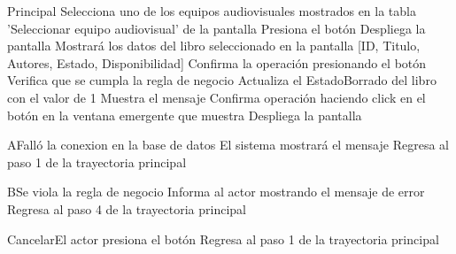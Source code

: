 
\begin{UCtrayectoria}{Principal}
		\UCpaso[\UCactor] Selecciona uno de los equipos audiovisuales mostrados en la tabla 'Seleccionar equipo audiovisual' de la pantalla 
		\UCpaso[\UCactor] Presiona el botón  
		\UCpaso[\UCsist] Despliega la pantalla 
		\UCpaso[\UCsist] Mostrará los datos del libro seleccionado en la pantalla [ID, Titulo, Autores, Estado, Disponibilidad]
		\UCpaso[\UCactor] Confirma la operación presionando el botón  
		\UCpaso[\UCsist] Verifica que se cumpla la regla de negocio  
		\UCpaso[\UCactor] Actualiza el EstadoBorrado del libro con el valor de 1 
		\UCpaso[\UCsist] Muestra el mensaje 
		\UCpaso[\UCactor] Confirma operación haciendo click en el botón  en la ventana emergente que muestra
		\UCpaso[\UCsist] Despliega la pantalla 
\end{UCtrayectoria}




\begin{UCtrayectoriaA}{A}{Falló la conexion en la base de datos}
			\UCpaso[\UCsist] El sistema mostrará el mensaje 
			\UCpaso[\UCsist] Regresa al paso 1 de la trayectoria principal 
\end{UCtrayectoriaA}


\begin{UCtrayectoriaA}{B}{Se viola la regla de negocio }	
			\UCpaso[\UCsist] Informa al actor mostrando el mensaje de error 
			\UCpaso[\UCsist] Regresa al paso 4 de la trayectoria principal 
\end{UCtrayectoriaA}


\begin{UCtrayectoriaA}{Cancelar}{El actor presiona el botón }
			\UCpaso[\UCsist] Regresa al paso 1 de la trayectoria principal  
\end{UCtrayectoriaA}